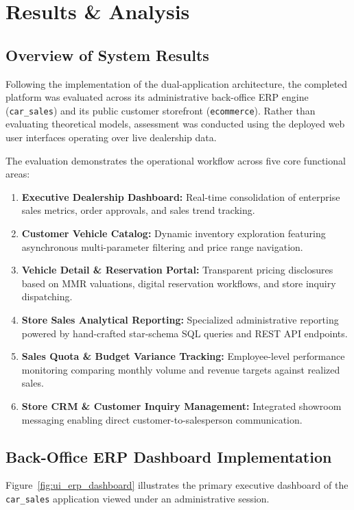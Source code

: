 \chapter{Results \& Analysis}

\section{Overview of System Results}
Following the implementation of the dual-application architecture, the completed platform was evaluated across its administrative back-office ERP engine (\texttt{car\_sales}) and its public customer storefront (\texttt{ecommerce}). Rather than evaluating theoretical models, assessment was conducted using the deployed web user interfaces operating over live dealership data.

The evaluation demonstrates the operational workflow across five core functional areas:
\begin{enumerate}
    \item \textbf{Executive Dealership Dashboard:} Real-time consolidation of enterprise sales metrics, order approvals, and sales trend tracking.
    \item \textbf{Customer Vehicle Catalog:} Dynamic inventory exploration featuring asynchronous multi-parameter filtering and price range navigation.
    \item \textbf{Vehicle Detail \& Reservation Portal:} Transparent pricing disclosures based on MMR valuations, digital reservation workflows, and store inquiry dispatching.
    \item \textbf{Store Sales Analytical Reporting:} Specialized administrative reporting powered by hand-crafted star-schema SQL queries and REST API endpoints.
    \item \textbf{Sales Quota \& Budget Variance Tracking:} Employee-level performance monitoring comparing monthly volume and revenue targets against realized sales.
    \item \textbf{Store CRM \& Customer Inquiry Management:} Integrated showroom messaging enabling direct customer-to-salesperson communication.
\end{enumerate}

\clearpage
\section{Back-Office ERP Dashboard Implementation}
Figure~\ref{fig:ui_erp_dashboard} illustrates the primary executive dashboard of the \texttt{car\_sales} application viewed under an administrative session.

